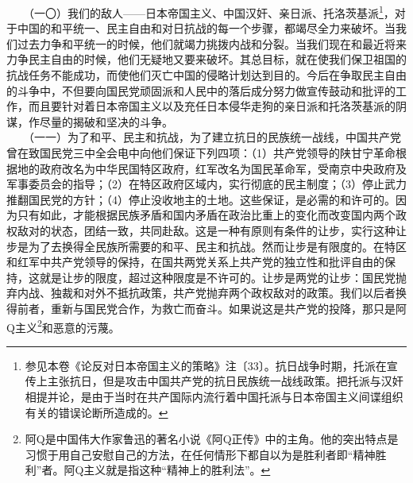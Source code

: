 \documentclass[cn,11pt,chinese]{elegantbook}
\begin{document}
　　（一〇）我们的敌人——日本帝国主义、中国汉奸、亲日派、托洛茨基派\footnote[18]{ 参见本卷《论反对日本帝国主义的策略》注〔33〕。抗日战争时期，托派在宣传上主张抗日，但是攻击中国共产党的抗日民族统一战线政策。把托派与汉奸相提并论，是由于当时在共产国际内流行着中国托派与日本帝国主义间谍组织有关的错误论断所造成的。}，对于中国的和平统一、民主自由和对日抗战的每一个步骤，都竭尽全力来破坏。当我们过去力争和平统一的时候，他们就竭力挑拨内战和分裂。当我们现在和最近将来力争民主自由的时候，他们无疑地又要来破坏。其总目标，就在使我们保卫祖国的抗战任务不能成功，而使他们灭亡中国的侵略计划达到目的。今后在争取民主自由的斗争中，不但要向国民党顽固派和人民中的落后成分努力做宣传鼓动和批评的工作，而且要针对着日本帝国主义以及充任日本侵华走狗的亲日派和托洛茨基派的阴谋，作尽量的揭破和坚决的斗争。\\
　　（一一）为了和平、民主和抗战，为了建立抗日的民族统一战线，中国共产党曾在致国民党三中全会电中向他们保证下列四项：（1）共产党领导的陕甘宁革命根据地的政府改名为中华民国特区政府，红军改名为国民革命军，受南京中央政府及军事委员会的指导；（2）在特区政府区域内，实行彻底的民主制度；（3）停止武力推翻国民党的方针；（4）停止没收地主的土地。这些保证，是必需的和许可的。因为只有如此，才能根据民族矛盾和国内矛盾在政治比重上的变化而改变国内两个政权敌对的状态，团结一致，共同赴敌。这是一种有原则有条件的让步，实行这种让步是为了去换得全民族所需要的和平、民主和抗战。然而让步是有限度的。在特区和红军中共产党领导的保持，在国共两党关系上共产党的独立性和批评自由的保持，这就是让步的限度，超过这种限度是不许可的。让步是两党的让步：国民党抛弃内战、独裁和对外不抵抗政策，共产党抛弃两个政权敌对的政策。我们以后者换得前者，重新与国民党合作，为救亡而奋斗。如果说这是共产党的投降，那只是阿Q主义\footnote[19]{ 阿Q是中国伟大作家鲁迅的著名小说《阿Q正传》中的主角。他的突出特点是习惯于用自己安慰自己的方法，在任何情形下都自以为是胜利者即“精神胜利”者。阿Q主义就是指这种“精神上的胜利法”。}和恶意的污蔑。\\
\end{document}
